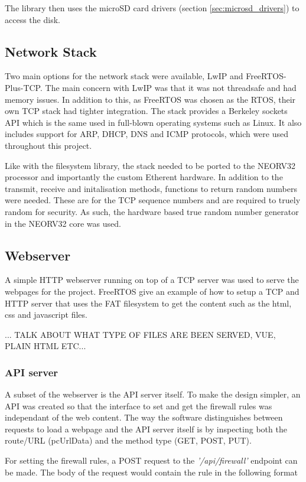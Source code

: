The library then uses the microSD card drivers (section \ref{sec:microsd_drivers}) to access the disk. 


\subsection{Network Stack}
\label{sec:freertos_tcpip_stack}

Two main options for the network stack were available, LwIP and FreeRTOS-Plus-TCP. The main concern with LwIP was that it was not threadsafe and had memory issues. In addition to this, as FreeRTOS was chosen as the RTOS, their own TCP stack had tighter integration. The stack provides a Berkeley sockets API which is the same used in full-blown operating systems such as Linux. It also includes support for ARP, DHCP, DNS and ICMP protocols, which were used throughout this project. 

Like with the filesystem library, the stack needed to be ported to the NEORV32 processor and importantly the custom Etherent hardware. In addition to the transmit, receive and initalisation methods, functions to return random numbers were needed. These are for the TCP sequence numbers and are required to truely random for security. As such, the hardware based true random number generator in the NEORV32 core was used. 


\subsection{Webserver}
A simple HTTP webserver running on top of a TCP server was used to serve the webpages for the project. FreeRTOS give an example of how to setup a TCP and HTTP server that uses the FAT filesystem to get the content such as the html, css and javascript files. 

... TALK ABOUT WHAT TYPE OF FILES ARE BEEN SERVED, VUE, PLAIN HTML ETC...


\subsubsection{API server}
A subset of the webserver is the API server itself. To make the design simpler, an API was created so that the interface to set and get the firewall rules was independant of the web content. The way the software distinguishes between requests to load a webpage and the API server itself is by inspecting both the route/URL (pcUrlData) and the method type (GET, POST, PUT).

For setting the firewall rules, a POST request to the \textit{'/api/firewall'} endpoint can be made. The body of the request would contain the rule in the following format

